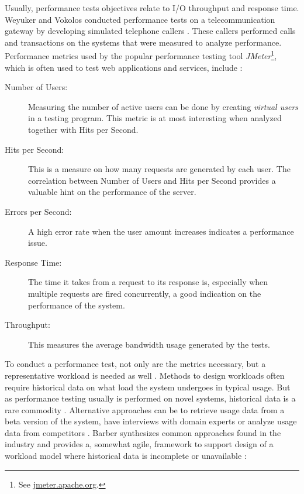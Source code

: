 Usually, performance tests objectives relate to I/O throughput and response
time. Weyuker and Vokolos conducted performance tests on a telecommunication
gateway by developing simulated telephone callers \cite{weyuker2000experience}.
These callers performed calls and transactions on the systems that were
measured to analyze performance. Performance metrics used by the popular
performance testing tool \textit{JMeter}\footnote{See
\url{jmeter.apache.org}.}, which is often used to test web applications and
services, include \cite{mendelawy2016kpis}:

\begin{description}
  \item[Number of Users:] Measuring the number of active users can be done by
    creating \textit{virtual users} in a testing program. This metric is at
    most interesting when analyzed together with Hits per Second.
  \item[Hits per Second:] This is a measure on how many requests are generated
    by each user. The correlation between Number of Users and Hits per Second
    provides a valuable hint on the performance of the server.
  \item[Errors per Second:] A high error rate when the user amount increases
    indicates a performance issue.
  \item[Response Time:] The time it takes from a request to its response is,
    especially when multiple requests are fired concurrently, a good indication
    on the performance of the system.
  \item[Throughput:] This measures the average bandwidth usage generated by the
    tests.
\end{description}

To conduct a performance test, not only are the metrics necessary, but a
representative workload is needed as well \cite{weyuker2000experience}.
Methods to design workloads often require historical data on what load the
system undergoes in typical usage. But as performance testing usually is
performed on novel systems, historical data is a rare commodity
\cite{barber2004creating}. Alternative approaches can be to retrieve usage data
from a beta version of the system, have interviews with domain experts or
analyze usage data from competitors \cite{jiang2015survey}. Barber synthesizes
common approaches found in the industry and provides a, somewhat agile,
framework to support design of a workload model where historical data is
incomplete or unavailable \cite{barber2004creating}:


